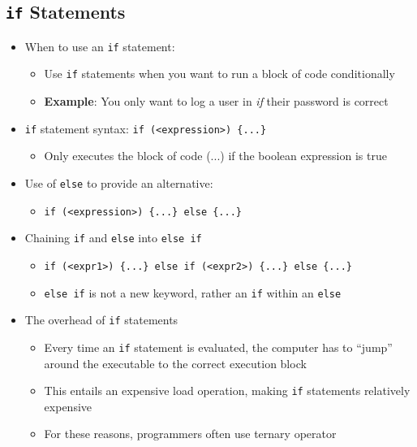 \documentclass{article}
\begin{document}


\subsection{\texttt{if} Statements}

\begin{itemize}
	\item When to use an \texttt{if} statement:
	\begin{itemize}
		\item Use \texttt{if} statements when you want to run a block of code conditionally
		\item \textbf{Example}: You only want to log a user in \textit{if} their password is correct
	\end{itemize}
	\item \texttt{if} statement syntax: \texttt{if (<expression>) \{...\}}
	\begin{itemize}
		\item Only executes the block of code (...) if the boolean expression is true
	\end{itemize}
	\item Use of \texttt{else} to provide an alternative:
	\begin{itemize}
		\item \texttt{if (<expression>) \{...\} else \{...\}}
	\end{itemize}
	
	\item Chaining \texttt{if} and \texttt{else} into \texttt{else if}
	\begin{itemize}
		\item \texttt{if (<expr1>) \{...\} else if (<expr2>) \{...\} else \{...\}}
		\item \texttt{else if} is not a new keyword, rather an \texttt{if} within an \texttt{else}
	\end{itemize}
	
	\item The overhead of \texttt{if} statements
	\begin{itemize}
		\item Every time an \texttt{if} statement is evaluated, the computer has to ``jump'' around the executable to the correct execution block
		\item This entails an expensive load operation, making \texttt{if} statements relatively expensive
		\item For these reasons, programmers often use ternary operator
	\end{itemize}
\end{itemize}
\end{document}
